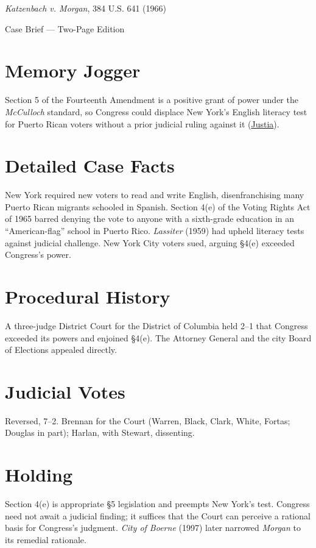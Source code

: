 \documentclass[12pt]{article}
\begin{document}
\begin{center}
{\LARGE \textit{Katzenbach v. Morgan}, 384 U.S. 641 (1966)\par}
\vspace{0.5em}
{\large Case Brief --- Two-Page Edition\par}
\end{center}

\section{Memory Jogger}
Section 5 of the Fourteenth Amendment is a positive grant of power under the \textit{McCulloch} standard, so Congress could displace New York's English literacy test for Puerto Rican voters without a prior judicial ruling against it (\href{https://supreme.justia.com/cases/federal/us/384/641/}{Justia}).

\section{Detailed Case Facts}
New York required new voters to read and write English, disenfranchising many Puerto Rican migrants schooled in Spanish. Section 4(e) of the Voting Rights Act of 1965 barred denying the vote to anyone with a sixth-grade education in an ``American-flag'' school in Puerto Rico. \textit{Lassiter} (1959) had upheld literacy tests against judicial challenge. New York City voters sued, arguing \S 4(e) exceeded Congress's power.

\section{Procedural History}
A three-judge District Court for the District of Columbia held 2--1 that Congress exceeded its powers and enjoined \S 4(e). The Attorney General and the city Board of Elections appealed directly.

\section{Judicial Votes}
Reversed, 7--2. Brennan for the Court (Warren, Black, Clark, White, Fortas; Douglas in part); Harlan, with Stewart, dissenting.

\section{Holding}
Section 4(e) is appropriate \S 5 legislation and preempts New York's test. Congress need not await a judicial finding; it suffices that the Court can perceive a rational basis for Congress's judgment. \textit{City of Boerne} (1997) later narrowed \textit{Morgan} to its remedial rationale.
\end{document}
